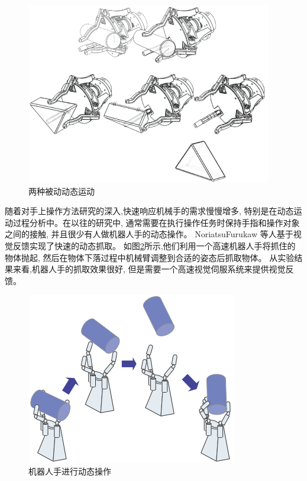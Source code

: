 \begin{figure}[!ht]
  \centering
  \includegraphics[scale=1]{chapter01/pics/1-2.png}
  \caption{两种被动动态运动}
  \label{fig:1-2}
  \vspace{-0.3cm}
\end{figure}

随着对手上操作方法研究的深入,快速响应机械手的需求慢慢增多,
特别是在动态运动过程分析中。在以往的研究中,
通常需要在执行操作任务时保持手指和操作对象之间的接触,
并且很少有人做机器人手的动态操作。
NoriatsuFurukaw 等人基于视觉反馈实现了快速的动态抓取。
如图\ref{fig:1-3}所示,他们利用一个高速机器人手将抓住的物体抛起,
然后在物体下落过程中机械臂调整到合适的姿态后抓取物体。
从实验结果来看,机器人手的抓取效果很好,
但是需要一个高速视觉伺服系统来提供视觉反馈\cite{ref8}。

\begin{figure}[!ht]
  \centering
  \includegraphics[scale=1]{chapter01/pics/1-3.png}
  \caption{机器人手进行动态操作}
  \label{fig:1-3}
  \vspace{-0.3cm}
\end{figure}

